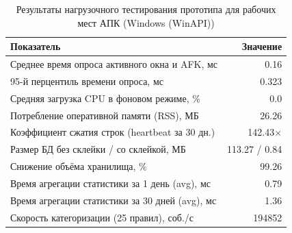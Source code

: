 \begin{table}[htbp]
\centering
\caption{Результаты нагрузочного тестирования прототипа для рабочих мест АПК (Windows (WinAPI))}
\label{tab:benchmark_results}
\begin{tabular}{|l|r|}
\hline
\textbf{Показатель} & \textbf{Значение} \\ \hline
Среднее время опроса активного окна и AFK, мс & 0.16 \\ \hline
95-й перцентиль времени опроса, мс & 0.323 \\ \hline
Средняя загрузка CPU в фоновом режиме, \% & 0.0 \\ \hline
Потребление оперативной памяти (RSS), МБ & 26.26 \\ \hline
Коэффициент сжатия строк (heartbeat за 30 дн.) & 142.43$\times$ \\ \hline
Размер БД без склейки / со склейкой, МБ & 113.27 / 0.84 \\ \hline
Снижение объёма хранилища, \% & 99.26 \\ \hline
Время агрегации статистики за 1 день (avg), мс & 0.79 \\ \hline
Время агрегации статистики за 30 дней (avg), мс & 1.36 \\ \hline
Скорость категоризации (25 правил), соб./с & 194852 \\ \hline
\end{tabular}
\end{table}
